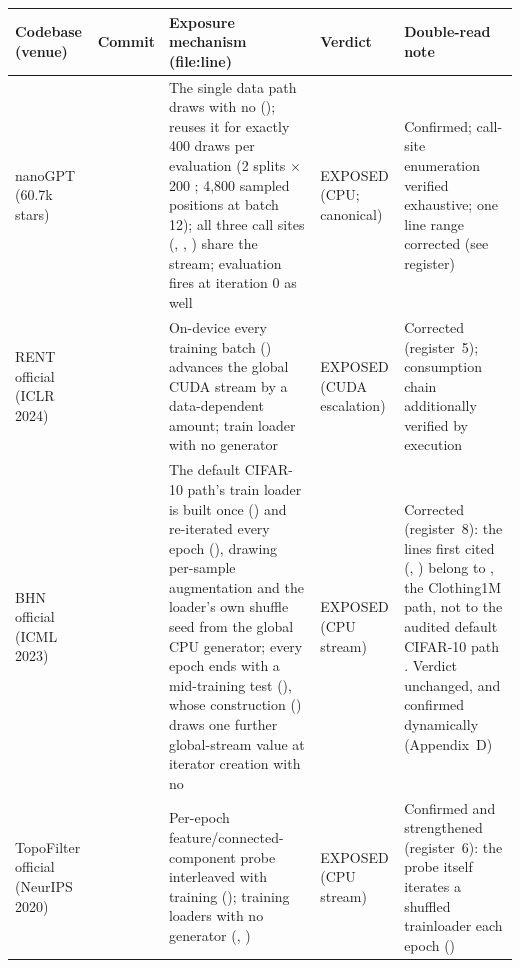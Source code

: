 \begin{table}[tbp]
\centering
\footnotesize
\setlength{\tabcolsep}{4pt}
\begin{tabular}{@{}L{2.0cm}L{1.1cm}L{5.7cm}L{1.6cm}L{3.3cm}@{}}
\toprule
Codebase (venue) & Commit & Exposure mechanism (file:line) & Verdict &
Double-read note \\
\midrule
nanoGPT (60.7k stars) &  &
The single data path  draws  with no
 ();  reuses it
for exactly 400 draws per evaluation (2 splits $\times$ 200
; 4{,}800 sampled positions at batch 12); all three call
sites (, , ) share the stream; evaluation
fires at iteration 0 as well &
EXPOSED (CPU; canonical) &
Confirmed; call-site enumeration verified exhaustive; one line range
corrected (see register) \\
\addlinespace
RENT official (ICLR 2024) &  &
On-device  every training batch
() advances the global CUDA stream by a
data-dependent amount; train loader  with no generator &
EXPOSED (CUDA escalation) &
Corrected (register~5); consumption chain additionally verified by
execution \\
\addlinespace
BHN official (ICML 2023) &  &
The default CIFAR-10 path's train loader is built once
() and re-iterated every epoch (), drawing
per-sample augmentation and the loader's own shuffle seed from the global
CPU generator; every epoch ends with a mid-training test
(), whose  construction ()
draws one further global-stream value at iterator creation with no
 &
EXPOSED (CPU stream) &
Corrected (register~8): the lines first cited
(, ) belong to
\allowbreak{}, the Clothing1M path, not to the audited
default CIFAR-10 path . Verdict unchanged, and
confirmed dynamically (Appendix~D) \\
\addlinespace
TopoFilter official (NeurIPS 2020) &  &
Per-epoch feature/connected-component probe interleaved with training
(); training loaders  with no
generator (, ) &
EXPOSED (CPU stream) &
Confirmed and strengthened (register~6): the probe itself iterates a
shuffled trainloader each epoch () \\

\end{tabular}
\end{table}

